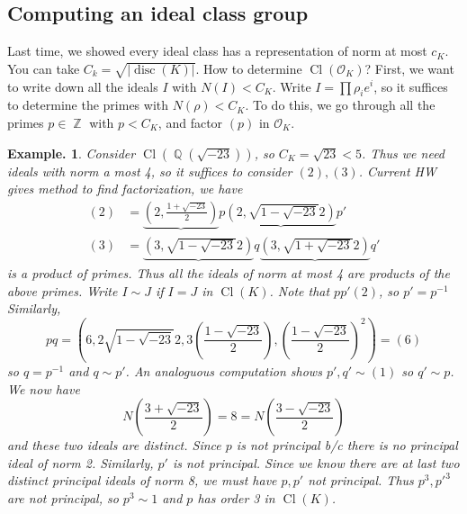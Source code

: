 \documentclass[11pt, a4paper]{memoir}
\DeclareMathOperator{\Q}{{\mathbb{Q}}}
\DeclareMathOperator{\Z}{{\mathbb{Z}}}
\theoremstyle{change}
\theoremstyle{plain}
\theoremstyle{nonumberplain}
\newtheorem{example}{Example.}
\DeclareMathOperator{\disc}{disc}
\DeclareMathOperator{\Cl}{Cl}
\begin{document}
\subsection{Computing an ideal class group}
Last time, we showed every ideal class has a representation of norm at most $c_K$.
You can take $C_k=\sqrt{|\disc(K)|}$.
How to determine $\Cl(\mathcal{O}_K)$?
First, we want to write down all the ideals $I$ with $N(I)<C_K$.
Write $I=\prod\rho_i e^i$, so it suffices to determine the primes with $N(\rho)<C_K$.
To do this, we go through all the primes $p\in\Z$ with $p<C_K$, and factor $(p)$ in $\mathcal{O}_K$.
\begin{example}
    Consider $\Cl(\Q(\sqrt{-23}))$, so $C_K=\sqrt{23}<5$.
    Thus we need ideals with norm a most 4, so it suffices to consider $(2),(3)$.
    Current HW gives method to find factorization, we have
    \begin{align*}
        (2)&=\underbrace{\left(2,\frac{1+\sqrt{-23}}{2}\right)}{p}\underbrace{\left(2,\sqrt{1-\sqrt{-23}}{2}\right)}{p'}\\
        (3)&=\underbrace{\left(3,\sqrt{1-\sqrt{-23}}{2}\right)}{q}\underbrace{\left(3,\sqrt{1+\sqrt{-23}}{2}\right)}{q'}
    \end{align*}
    is a product of primes.
    Thus all the ideals of norm at most 4 are products of the above primes.
    Write $I\sim J$ if $I=J$ in $\Cl(K)$.
    Note that $pp'(2)$, so $p'=p^{-1}$
    Similarly,
    \begin{equation*}
        pq=\left(6,2\sqrt{1-\sqrt{-23}}{2},3\left(\frac{1-\sqrt{-23}}{2}\right),\left(\frac{1-\sqrt{-23}}{2}\right)^2\right)=(6)
    \end{equation*}
    so $q=p^{-1}$ and $q\sim p'$.
    An analoguous computation shows $p',q'\sim(1)$ so $q'\sim p$.
    We now have
    \begin{equation*}
        N\left(\frac{3+\sqrt{-23}}{2}\right)=8=N\left(\frac{3-\sqrt{-23}}{2}\right)
    \end{equation*}
    and these two ideals are distinct.
    Since $p$ is not principal b/c there is no principal ideal of norm 2.
    Similarly, $p'$ is not principal.
    Since we know there are at last two distinct principal ideals of norm 8, we must have $p,p'$ not principal.
    Thus $p^3,p'^3$ are not principal, so $p^3\sim 1$ and $p$ has order 3 in $\Cl(K)$.
\end{example}
\end{document}
